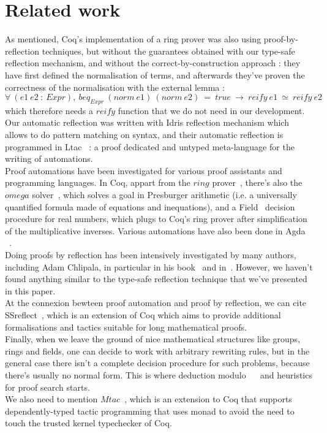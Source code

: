 \section{Related work}
\label{sect:relatedWork}

As mentioned, Coq's implementation of a ring prover was also using proof-by-reflection techniques, but without the guarantees obtained with our type-safe reflection mechanism, and without the correct-by-construction approach : they have first defined the normalisation of terms, and afterwards they've proven the correctness of the normalisation with the external lemma :
$\forall\ (e1\ e2\ :\ Expr),\ beq_{Expr}\ (norm\ e1)\ (norm\ e2)\ =\ true\ \rightarrow\ reify\ e1\ \simeq\ reify\ e2$ which therefore needs a $reify$ function that we do not need in our development.
Our automatic reflection was written with Idris reflection mechanism which allows to do pattern matching on syntax, and their automatic reflection is programmed in Ltac~\cite{DelahayeLTac} : a proof dedicated and untyped meta-language for the writing of automations. \\

Proof automations have been investigated for various proof assistants and programming languages. In Coq, appart from the $ring$ prover~\cite{Coq2005}, there's also the $omega$ solver~\cite{Cregut04}, which solves a goal in Presburger arithmetic (i.e. a universally quantified formula made of equations and inequations), and a Field~\cite{DelahayeField} decision procedure for real numbers, which plugs to Coq's ring prover after simplification of the multiplicative inverses. Various automations have also been done in Agda~\cite{DBLP:conf/mpc/KokkeS15} ~\cite{Lindblad04}. \\

Doing proofs by reflection has been intensively investigated by many authors, including Adam Chlipala, in particular in his book~\cite{ChlipalaBook} and in~\cite{Malecha14}. However, we haven't found anything similar to the type-safe reflection technique that we've presented in this paper. \\

At the connexion bewteen proof automation and proof by reflection, we can cite SSreflect~\cite{GonthierTuto}, which is an extension of Coq which aims to provide additional formalisations and tactics suitable for long mathematical proofs. \\

Finally, when we leave the ground of nice mathematical structures like groups, rings and fields, one can decide to work with arbitrary rewriting rules, but in the general case there isn't a complete decision procedure for such problems, because there's usually no normal form. This is where deduction modulo~\cite{Dowek03} ~\cite{DelahayeModulo} and heuristics for proof search starts. \\

We also need to mention $Mtac$~\cite{Ziliani13}, which is an extension to Coq that supports dependently-typed tactic programming that uses monad to avoid the need to touch the trusted kernel typechecker of Coq.



